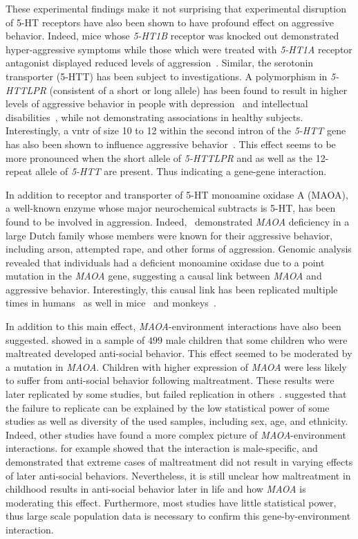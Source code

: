 These experimental findings make it not surprising that experimental disruption of 5-HT receptors have also been shown to have profound effect on aggressive behavior.  
Indeed, mice whose \textit{5-HT1B} receptor was knocked out demonstrated hyper-aggressive symptoms while those which were treated with \textit{5-HT1A} receptor antagonist displayed reduced levels of aggression~\cite{Saudou1994,Bell1994}.
Similar, the serotonin transporter (5-HTT) has been subject to investigations.
A polymorphism in \textit{5-HTTLPR} (consistent of a short or long allele)  has been found to result in higher levels of aggressive behavior in  people with depression~\cite{Gonda2011} and intellectual disabilities~\cite{May2010}, while not demonstrating associations in healthy subjects.
Interestingly, a \acrfull{vntr} of size 10 to 12 within the second intron of the \textit{5-HTT} gene has also been shown to influence aggressive behavior~\cite{Aluja2009}. 
This effect seems to be more pronounced when the short allele of \textit{5-HTTLPR} and as well as the 12-repeat allele of \textit{5-HTT} are present. 
Thus indicating a gene-gene interaction.

In addition to receptor and transporter of 5-HT monoamine oxidase A (MAOA), a well-known enzyme whose major neurochemical subtracts is 5-HT, has been found to be involved in aggression.
Indeed,~\citet{Brunner1993} demonstrated \textit{MAOA} deficiency in a large  Dutch family whose members were known for their aggressive behavior, including arson, attempted rape, and other forms of aggression.
Genomic analysis revealed that individuals had a deficient monoamine oxidase due to a point mutation in the \textit{MAOA} gene, suggesting a causal link between \textit{MAOA} and aggressive behavior.
Interestingly, this causal link has been replicated multiple times in humans~\cite{Huang2004,Manuck2000} as well in mice~\cite{Cases1995} and monkeys~\cite{Newman2005}.

In addition to this main effect, \textit{MAOA}-environment interactions have also been suggested.
\citet{Caspi2002} showed in a sample of $499$ male children that some children who were maltreated developed anti-social behavior.
This effect seemed to be moderated by a mutation in \textit{MAOA}.
Children with higher expression of \textit{MAOA} were less likely to suffer from anti-social behavior following maltreatment.
These results were later replicated by some studies, but failed replication in others~\cite{KimCohen2006}.
\citet{Anholt2012} suggested that the failure to replicate can be explained by the low statistical power of some studies as well as diversity of the used samples, including sex, age, and ethnicity.
Indeed, other studies have found a more complex picture of \textit{MAOA}-environment interactions.
\citet{Huang2004} for example showed that the interaction is male-specific, and~\citet{Weder2009} demonstrated that extreme cases of maltreatment did not result in varying effects of later anti-social behaviors.
Nevertheless, it is still unclear how maltreatment in childhood results in anti-social behavior later in life and how \textit{MAOA} is moderating this effect.
Furthermore, most studies have little statistical power,
thus large scale population data is necessary to confirm this gene-by-environment interaction.

